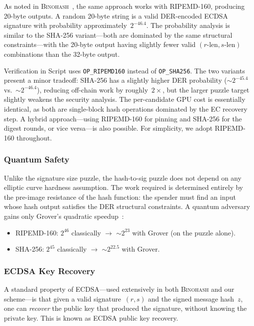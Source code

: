 \documentclass[11pt, a4paper]{article}
\begin{document}
As noted in \textsc{Binohash}~\cite[Appendix~D]{linus2024binohash}, the same approach works with RIPEMD-160, producing 20-byte outputs. A random 20-byte string is a valid DER-encoded ECDSA signature with probability approximately~$2^{-46.4}$. The probability analysis is similar to the SHA-256 variant---both are dominated by the same structural constraints---with the 20-byte output having slightly fewer valid $(r\text{-len}, s\text{-len}) $ combinations than the 32-byte output.

Verification in Script uses \texttt{OP\_RIPEMD160} instead of \texttt{OP\_SHA256}. The two variants present a minor tradeoff: SHA-256 has a slightly higher DER probability (${\sim}2^{-45.4}$ vs.~${\sim}2^{-46.4}$), reducing off-chain work by roughly~$2\times$, but the larger puzzle target slightly weakens the security analysis. The per-candidate GPU cost is essentially identical, as both are single-block hash operations dominated by the EC recovery step. A hybrid approach---using RIPEMD-160 for pinning and SHA-256 for the digest rounds, or vice versa---is also possible. For simplicity, we adopt RIPEMD-160 throughout.

\subsubsection{Quantum Safety}
\label{sec:hash-puzzle-qs}

Unlike the signature size puzzle, the hash-to-sig puzzle does not depend on any elliptic curve hardness assumption. The work required is determined entirely by the pre-image resistance of the hash function: the spender must find an input whose hash output satisfies the DER structural constraints. A quantum adversary gains only Grover's quadratic speedup~\cite{grover1996}:

\begin{itemize}
    \item RIPEMD-160: $2^{46}$ classically $\to$ ${\sim}2^{23}$ with Grover (on the puzzle alone).
    \item SHA-256: $2^{45}$ classically $\to$ ${\sim}2^{22.5}$ with Grover.
\end{itemize}

\subsubsection{ECDSA Key Recovery}
\label{sec:key-recovery}

A standard property of ECDSA---used extensively in both \textsc{Binohash} and our scheme---is that given a valid signature~$(r, s)$ and the signed message hash~$z$, one can \emph{recover} the public key that produced the signature, without knowing the private key. This is known as ECDSA public key recovery.
\end{document}

